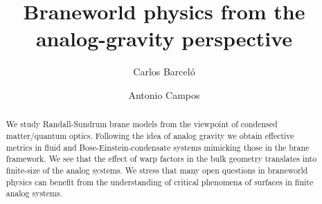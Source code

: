 \documentclass[a4paper,prl,showpacs,twocolumn]{revtex4}
\begin{document}
\def\Barcelo{Barcel\'o}
\def\Schrodinger{Schr\"odinger}
\title[Braneworld physics from ...\dots]{Braneworld physics from the 
analog-gravity perspective}
\author{Carlos \Barcelo}
\author{Antonio Campos}
\begin{abstract}

We study Randall-Sundrum brane models from the viewpoint of condensed 
matter/quantum optics. 
Following the idea of analog gravity we obtain effective
metrics in fluid and Bose-Einstein-condensate systems
mimicking those in the brane framework.
We see that the effect of warp factors in the bulk geometry translates
into finite-size of the analog systems.
We stress that many open questions in braneworld physics
can benefit from the understanding of critical phenomena of surfaces 
in finite analog systems.


\end{abstract}
\maketitle
\end{document}

